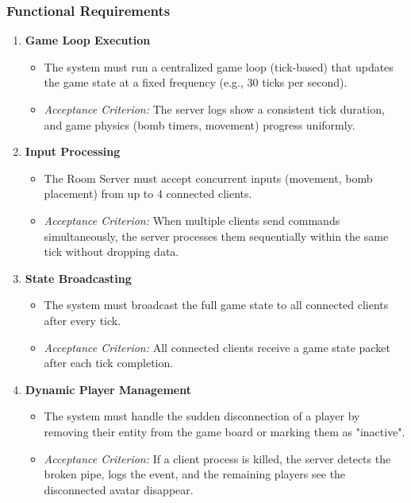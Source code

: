 \subsubsection{Functional Requirements}
\begin{enumerate}
    \item \textbf{Game Loop Execution}
    \begin{itemize}
        \item The system must run a centralized game loop (tick-based) that updates the game state at a fixed frequency (e.g., 30 ticks per second).
        \item \textit{Acceptance Criterion:} The server logs show a consistent tick duration, and game physics (bomb timers, movement) progress uniformly.
    \end{itemize}

    \item \textbf{Input Processing}
    \begin{itemize}
        \item The Room Server must accept concurrent inputs (movement, bomb placement) from up to 4 connected clients.
        \item \textit{Acceptance Criterion:} When multiple clients send commands simultaneously, the server processes them sequentially within the same tick without dropping data.
    \end{itemize}

    \item \textbf{State Broadcasting}
    \begin{itemize}
        \item The system must broadcast the full game state to all connected clients after every tick.
        \item \textit{Acceptance Criterion:} All connected clients receive a game state packet after each tick completion.
    \end{itemize}

    \item \textbf{Dynamic Player Management}
    \begin{itemize}
        \item The system must handle the sudden disconnection of a player by removing their entity from the game board or marking them as "inactive".
        \item \textit{Acceptance Criterion:} If a client process is killed, the server detects the broken pipe, logs the event, and the remaining players see the disconnected avatar disappear.
    \end{itemize}
\end{enumerate}

